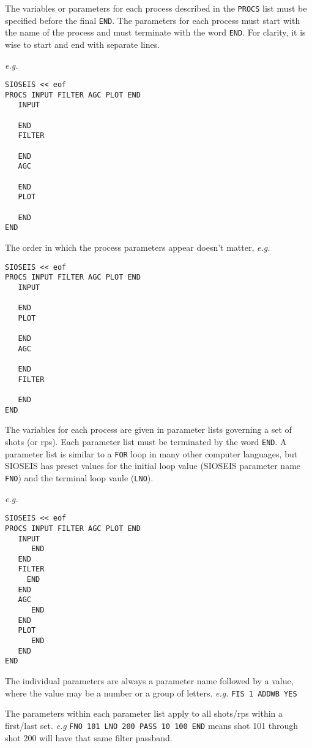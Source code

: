 The variables or parameters for each process described in the \texttt{PROCS}
list must be specified before the final \texttt{END}.  The parameters for each
process must start with the name of the process and must terminate with the
word \texttt{END}.  For clarity, it is wise to start and end with separate
lines.

\textit{e.g.}
\begin{verbatim}
SIOSEIS << eof
PROCS INPUT FILTER AGC PLOT END
   INPUT

   END
   FILTER

   END
   AGC

   END
   PLOT

   END
END
\end{verbatim}

The order in which the process parameters appear doesn't matter, \textit{e.g.}

\begin{verbatim}
SIOSEIS << eof
PROCS INPUT FILTER AGC PLOT END
   INPUT

   END
   PLOT

   END
   AGC

   END
   FILTER

   END
END
\end{verbatim}

The variables for each process are given in parameter lists governing a set of
\glspl{shot} (or \glspl{rp}).  Each parameter list must be terminated by the word
\texttt{END}.  A parameter list is similar to a \texttt{FOR} loop in many other
computer languages, but SIOSEIS has preset values for the initial loop value
(SIOSEIS parameter name \texttt{FNO}) and the terminal loop vaule
(\texttt{LNO}).

\textit{e.g.}
\begin{verbatim}
SIOSEIS << eof
PROCS INPUT FILTER AGC PLOT END
   INPUT
      END
   END
   FILTER
     END
   END
   AGC
      END
   END
   PLOT
      END
   END
END
\end{verbatim}

The individual parameters are always a parameter name followed by a value,
where the value may be a number or a group of letters.  \textit{e.g.}
\texttt{FIS 1   ADDWB YES}

The parameters within each parameter list apply to all \glspl{shot}/\glspl{rp} within
a first/last set.  \textit{e.g} \texttt{FNO 101 LNO 200 PASS 10 100 END}
means \gls{shot} 101 through \gls{shot} 200 will have that same filter passband.

